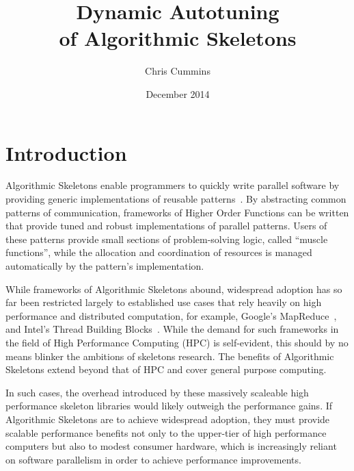 
\author{Chris Cummins}

\date{December 2014}

\title{Dynamic Autotuning\\of Algorithmic Skeletons}

\newcommand{\subtitle}{MSc Research Proposal}

\newcommand{\degreeTitle}{MSc by Research\\ Pervasive Parallelism}

\newcommand{\institution}{School of Informatics,\\
  The University of Edinburgh}



\section{Introduction}
Algorithmic Skeletons enable programmers to quickly write parallel
software by providing generic implementations of reusable
patterns~\cite{Cole1989, Cole2004}. By abstracting common patterns of
communication, frameworks of Higher Order Functions can be written
that provide tuned and robust implementations of parallel
patterns. Users of these patterns provide small sections of
problem-solving logic, called ``muscle functions'', while the
allocation and coordination of resources is managed automatically by
the pattern's implementation.

While frameworks of Algorithmic Skeletons abound, widespread adoption
has so far been restricted largely to established use cases that rely
heavily on high performance and distributed computation, for example,
Google's MapReduce~\cite{Dean2008}, and Intel's Thread Building
Blocks~\cite{IntelTBB}. While the demand for such frameworks in the
field of High Performance Computing (HPC) is self-evident, this should
by no means blinker the ambitions of skeletons research. The benefits
of Algorithmic Skeletons extend beyond that of HPC and cover general
purpose computing.

In such cases, the overhead introduced by these massively scaleable
high performance skeleton libraries would likely outweigh the
performance gains. If Algorithmic Skeletons are to achieve widespread
adoption, they must provide scalable performance benefits not only to
the upper-tier of high performance computers but also to modest
consumer hardware, which is increasingly reliant on software
parallelism in order to achieve performance improvements.

